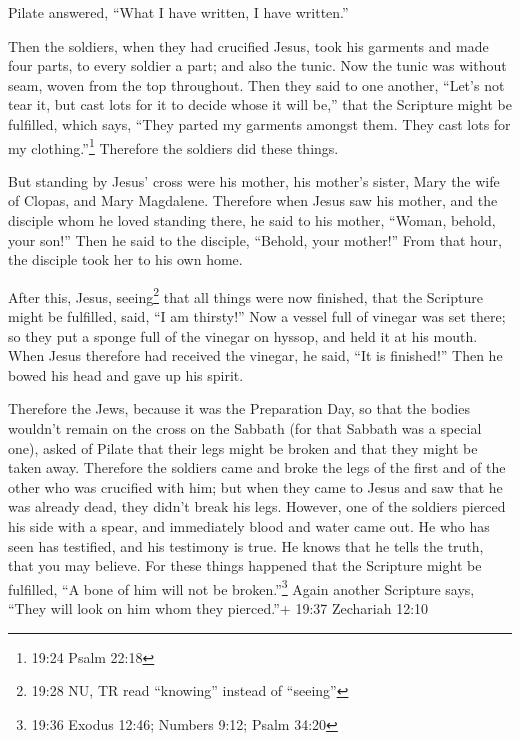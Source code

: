  Pilate answered, ``What I have written, I have written.''

 Then the soldiers, when they had crucified Jesus, took his
garments and made four parts, to every soldier a part; and also the
tunic. Now the tunic was without seam, woven from the top throughout.
 Then they said to one another, ``Let's not tear it, but
cast lots for it to decide whose it will be,'' that the Scripture might
be fulfilled, which says, ``They parted my garments amongst them. They
cast lots for my clothing.''\footnote{19:24 Psalm 22:18} Therefore the
soldiers did these things.

 But standing by Jesus' cross were his mother, his mother's
sister, Mary the wife of Clopas, and Mary Magdalene. 
Therefore when Jesus saw his mother, and the disciple whom he loved
standing there, he said to his mother, ``Woman, behold, your son!''
 Then he said to the disciple, ``Behold, your mother!''
From that hour, the disciple took her to his own home.

 After this, Jesus, seeing\footnote{19:28 NU, TR read
  ``knowing'' instead of ``seeing''} that all things were now finished,
that the Scripture might be fulfilled, said, ``I am thirsty!''
 Now a vessel full of vinegar was set there; so they put a
sponge full of the vinegar on hyssop, and held it at his mouth.
 When Jesus therefore had received the vinegar, he said,
``It is finished!'' Then he bowed his head and gave up his spirit.

 Therefore the Jews, because it was the Preparation Day, so
that the bodies wouldn't remain on the cross on the Sabbath (for that
Sabbath was a special one), asked of Pilate that their legs might be
broken and that they might be taken away.  Therefore the
soldiers came and broke the legs of the first and of the other who was
crucified with him;  but when they came to Jesus and saw
that he was already dead, they didn't break his legs. 
However, one of the soldiers pierced his side with a spear, and
immediately blood and water came out.  He who has seen has
testified, and his testimony is true. He knows that he tells the truth,
that you may believe.  For these things happened that the
Scripture might be fulfilled, ``A bone of him will not be
broken.''\footnote{19:36 Exodus 12:46; Numbers 9:12; Psalm 34:20}
 Again another Scripture says, ``They will look on him whom
they pierced.''+ 19:37 Zechariah 12:10

